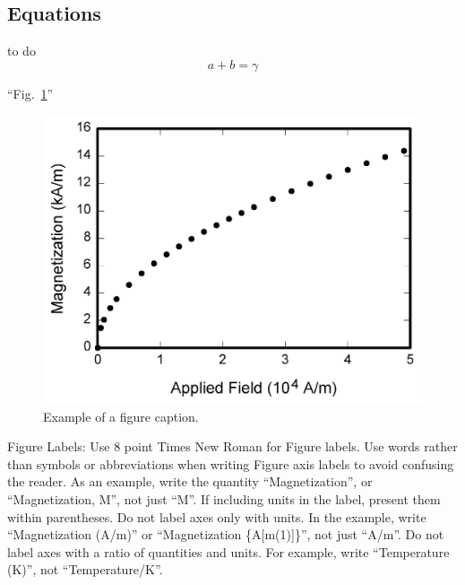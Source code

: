\documentclass[conference]{IEEEtran}
\begin{document}
\subsection{Equations}
to do
\begin{equation}
a+b=\gamma\label{eq}
\end{equation}



``Fig.~\ref{fig}''



\begin{figure}[htbp]
\centerline{\includegraphics{fig1.png}}
\caption{Example of a figure caption.}
\label{fig}
\end{figure}

Figure Labels: Use 8 point Times New Roman for Figure labels. Use words 
rather than symbols or abbreviations when writing Figure axis labels to 
avoid confusing the reader. As an example, write the quantity 
``Magnetization'', or ``Magnetization, M'', not just ``M''. If including 
units in the label, present them within parentheses. Do not label axes only 
with units. In the example, write ``Magnetization (A/m)'' or ``Magnetization 
\{A[m(1)]\}'', not just ``A/m''. Do not label axes with a ratio of 
quantities and units. For example, write ``Temperature (K)'', not 
``Temperature/K''.
\end{document}
